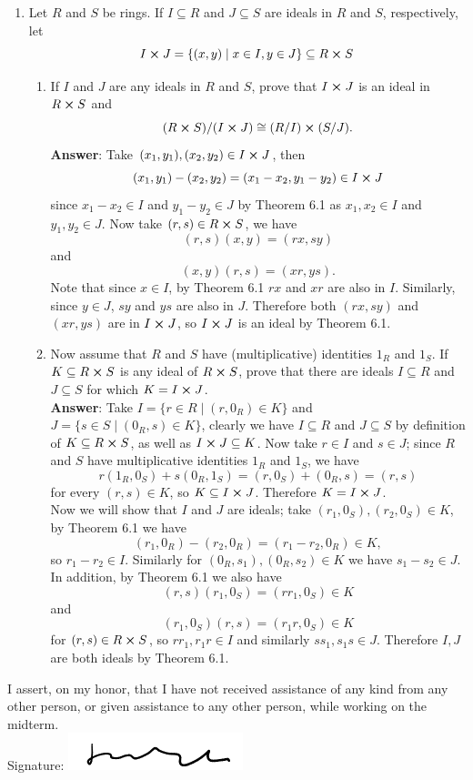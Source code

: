 \documentclass{article}
\begin{document}
\begin{enumerate}
\begin{enumerate}
            \end{enumerate}
      \item Let $R$ and $S$ be rings. If $I\subseteq R$ and $J\subseteq S$ are ideals in $R$ and $S$, respectively, let \[I\cross J=\{(x,y)\mid x\in I,y\in J\}\subseteq R\cross S\]
            \begin{enumerate}
                  \item If $I$ and $J$ are any ideals in $R$ and $S$, prove that $I\cross J$ is an ideal in $R\cross S$ and \[(R\cross S)/(I\cross J)\cong(R/I)\cross(S/J).\]
                        \textbf{Answer}: Take $(x_1,y_1),(x_2,y_2)\in I\cross J$, then \[(x_1,y_1)-(x_2,y_2)=(x_1-x_2,y_1-y_2)\in I\cross J\] since $x_1-x_2\in I$ and $y_1-y_2\in J$ by Theorem 6.1 as $x_1,x_2\in I$ and $y_1,y_2\in J$. Now take $(r,s)\in R\cross S$, we have \[(r,s)(x,y)=(rx,sy)\] and \[(x,y)(r,s)=(xr,ys).\] Note that since $x\in I$, by Theorem 6.1 $rx$ and $xr$ are also in $I$. Similarly, since $y\in J$, $sy$ and $ys$ are also in $J$. Therefore both $(rx,sy)$ and $(xr,ys)$ are in $I\cross J$, so $I\cross J$ is an ideal by Theorem 6.1.
                  \item Now assume that $R$ and $S$ have (multiplicative) identities $1_R$ and $1_S$. If $K\subseteq R\cross S$ is any ideal of $R\cross S$, prove that there are ideals $I\subseteq R$ and $J\subseteq S$ for which $K=I\cross J$.\\
                        \textbf{Answer}: Take $I=\{r\in R\mid (r,0_R)\in K\}$ and $J=\{s\in S\mid (0_R,s)\in K\}$, clearly we have $I\subseteq R$ and $J\subseteq S$ by definition of $K\subseteq R\cross S$, as well as $I\cross J\subseteq K$. Now take $r\in I$ and $s\in J$; since $R$ and $S$ have multiplicative identities $1_R$ and $1_S$, we have \[r(1_R,0_S)+s(0_R,1_S)=(r,0_S)+(0_R,s)=(r,s)\] for every $(r,s)\in K$, so $K\subseteq I\cross J$. Therefore $K=I\cross J$.\\
                        Now we will show that $I$ and $J$ are ideals; take $(r_1,0_S),(r_2,0_S)\in K$, by Theorem 6.1 we have \[(r_1,0_R)-(r_2,0_R)=(r_1-r_2,0_R)\in K,\] so $r_1-r_2\in I$. Similarly for $(0_R,s_1),(0_R,s_2)\in K$ we have $s_1-s_2\in J$. In addition, by Theorem 6.1 we also have \[(r,s)(r_1,0_S)=(rr_1,0_S)\in K\] and \[(r_1,0_S)(r,s)=(r_1r,0_S)\in K\] for $(r,s)\in R\cross S$, so $rr_1,r_1r\in I$ and similarly $ss_1,s_1s\in J$. Therefore $I,J$ are both ideals by Theorem 6.1.
            \end{enumerate}
\end{enumerate}
\newpage
I assert, on my honor, that I have not received assistance of any kind from any other person, or given assistance to any other person, while working on the midterm.\\
Signature: \includegraphics[width=2in]{signature.png}
\end{document}
